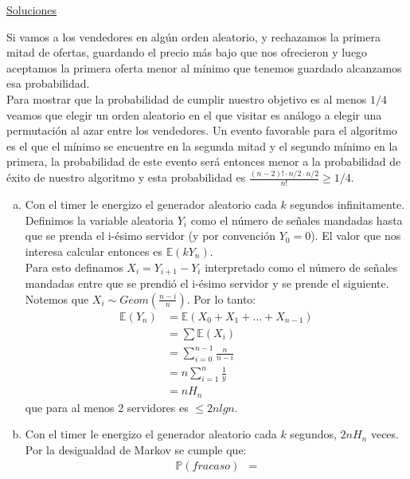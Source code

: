 \documentclass[dcc,uchile]{fcfmcourse}
\theoremstyle{plain}
\theoremstyle{definition}
\begin{document}
\newpage
\begin{center}
{\huge \underline{Soluciones}}
\end{center}
\begin{problems}
\problem Si vamos a los vendedores en algún orden aleatorio, y rechazamos la primera mitad de ofertas, guardando el precio más bajo que nos ofrecieron y luego aceptamos la primera oferta menor al mínimo que tenemos guardado alcanzamos esa probabilidad. \\
Para mostrar que la probabilidad de cumplir nuestro objetivo es al menos $1/4$ veamos que elegir un orden aleatorio en el que visitar es análogo a elegir una permutación al azar entre los vendedores. Un evento favorable para el algoritmo es el que el mínimo se encuentre en la segunda mitad y el segundo mínimo en la primera, la probabilidad de este evento será entonces menor a la probabilidad de éxito de nuestro algoritmo y esta probabilidad es $\frac{(n-2)!\cdot n/2 \cdot n/2}{n!} \ge 1/4$.
\problem 
\begin{enumerate}[a)]
    \item Con el timer le energizo el generador aleatorio cada $k$ segundos infinitamente.\\
    Definimos la variable aleatoria $Y_{i}$ como el número de señales mandadas hasta que se prenda el i-ésimo servidor (y por convención $Y_{0} = 0$). El valor que nos interesa calcular entonces es $\mathbb{E}(kY_{n})$.\\
    Para esto definamos $X_{i} = Y_{i+1} - Y_{i}$ interpretado como el número de señales mandadas entre que se prendió el i-ésimo servidor y se prende el siguiente. Notemos que $X_{i} \sim Geom\left(\frac{n-i}{n}\right)$. Por lo tanto:
    \begin{align*}
        \mathbb{E}(Y_{n}) &= \mathbb{E}(X_{0} + X_{1} + \ldots + X_{n-1})\\
        &= \sum \mathbb{E}(X_{i})\\
        &= \sum_{i=0}^{n-1} \frac{n}{n-i}\\
        &= n\sum_{i=1}^{n}\frac{1}{y}\\
        &= nH_{n}
    \end{align*}
    que para al menos 2 servidores es $\le 2nlg n$.
    \item Con el timer le energizo el generador aleatorio cada $k$ segundos, $2nH_{n}$ veces.\\
    Por la desigualdad de Markov se cumple que:
    \begin{align*}
        \mathbb{P}(fracaso) &=\\

\end{align*}
\end{enumerate}
\end{problems}
\end{document}
